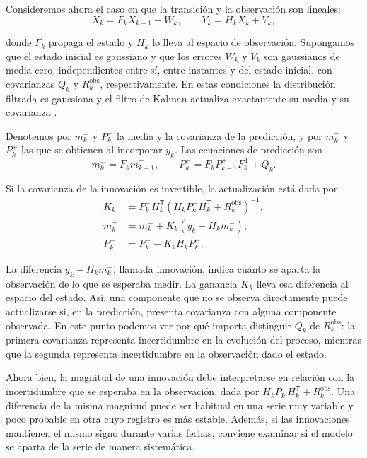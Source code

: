 Consideremos ahora el caso en que la transición y la observación son lineales:
\begin{equation}
    X_k=F_kX_{k-1}+W_k,\qquad Y_k=H_kX_k+V_k,
\end{equation}

donde $F_k$ propaga el estado y $H_k$ lo lleva al espacio de observación. Supongamos que el estado inicial es gaussiano y que los errores $W_k$ y $V_k$ son gaussianos de media cero, independientes entre sí, entre instantes y del estado inicial, con covarianzas $Q_k$ y $R_k^{\mathrm{obs}}$, respectivamente. En estas condiciones la distribución filtrada es gaussiana y el filtro de Kalman actualiza exactamente su media y su covarianza \cite{kalman1960}\label{cita:kalman1960}.

Denotemos por $m_k^-$ y $P_k^-$ la media y la covarianza de la predicción, y por $m_k^+$ y $P_k^+$ las que se obtienen al incorporar $y_k$. Las ecuaciones de predicción son
\begin{equation}
    m_k^-=F_km_{k-1}^+,\qquad
    P_k^-=F_kP_{k-1}^+F_k^{\mathsf T}+Q_k.
\end{equation}

Si la covarianza de la innovación es invertible, la actualización está dada por
\begin{align}
    K_k &= P_k^-H_k^{\mathsf T}
      (H_kP_k^-H_k^{\mathsf T}+R_k^{\mathrm{obs}})^{-1},\\
    m_k^+ &= m_k^-+K_k(y_k-H_km_k^-),\\
    P_k^+ &= P_k^--K_kH_kP_k^-.
\end{align}

La diferencia $y_k-H_km_k^-$, llamada innovación, indica cuánto se aparta la observación de lo que se esperaba medir. La ganancia $K_k$ lleva esa diferencia al espacio del estado. Así, una componente que no se observa directamente puede actualizarse si, en la predicción, presenta covarianza con alguna componente observada. En este punto podemos ver por qué importa distinguir $Q_k$ de $R_k^{\mathrm{obs}}$: la primera covarianza representa incertidumbre en la evolución del proceso, mientras que la segunda representa incertidumbre en la observación dado el estado.


Ahora bien, la magnitud de una innovación debe interpretarse en relación con la incertidumbre que se esperaba en la observación, dada por $H_kP_k^-H_k^{\mathsf T}+R_k^{\mathrm{obs}}$. Una diferencia de la misma magnitud puede ser habitual en una serie muy variable y poco probable en otra cuyo registro es más estable. Además, si las innovaciones mantienen el mismo signo durante varias fechas, conviene examinar si el modelo se aparta de la serie de manera sistemática.
